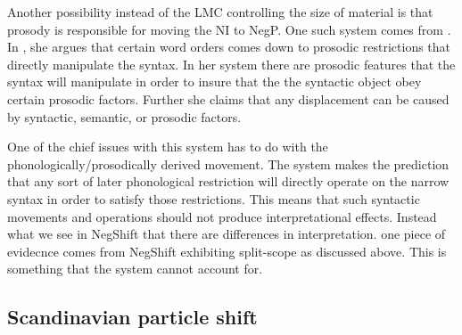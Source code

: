 \documentclass[12pt, letterpaper]{article}
\begin{document}
Another possibility instead of the LMC controlling the size of material is that prosody is responsible for moving the NI to NegP. One such system comes from \citet{zubizarretaProsodyFocusWord1998}. In \citet{zubizarretaProsodyFocusWord1998}, she argues that certain word orders comes down to prosodic restrictions that directly manipulate the syntax. In her system there are prosodic features that the syntax will manipulate in order to insure that the the syntactic object obey certain prosodic factors. Further she claims that any displacement can be caused by syntactic, semantic, or prosodic factors. 

One of the chief issues with this system has to do with the phonologically/prosodically derived movement. The \citeauthor{zubizarretaProsodyFocusWord1998} system makes the prediction that any sort of later phonological restriction will directly operate on the narrow syntax in order to satisfy those restrictions. This means that such syntactic movements and operations should not produce interpretational effects. Instead what we see in NegShift that there are differences in interpretation. one piece of evidecnce comes from NegShift exhibiting split-scope \citep{iatridouNegativeDPsAMovement2011,zeijlstraSyntacticallyComplexStatus2011}as discussed above. This is something that the \citeauthor{zubizarretaProsodyFocusWord1998} system cannot account for. 

\subsection{Scandinavian particle shift} \label{sec:Particles}
\end{document}

